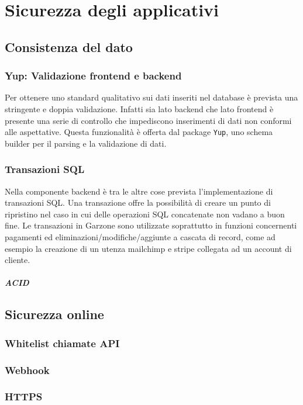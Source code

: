 \chapter{Sicurezza degli applicativi}
\section{Consistenza del dato}
\subsection{Yup: Validazione frontend e backend}
Per ottenere uno standard qualitativo sui dati inseriti nel database è prevista una stringente e doppia validazione. Infatti sia lato backend che lato frontend è presente una serie di controllo che impediscono inserimenti di dati non conformi alle aspettative. Questa funzionalità è offerta dal package \lstinline[basicstyle=\ttfamily]!Yup!, uno schema builder per il parsing e la validazione di dati.
\subsection{Transazioni SQL}
Nella componente backend è tra le altre cose prevista l'implementazione di transazioni SQL. Una transazione offre la possibilità di creare un punto di ripristino nel caso in cui delle operazioni SQL concatenate non vadano a buon fine. Le transazioni in Garzone sono utilizzate soprattutto in funzioni concernenti pagamenti ed eliminazioni/modifiche/aggiunte a cascata di record, come ad esempio la creazione di un utenza mailchimp e stripe collegata ad un account di cliente.
\paragraph{ACID}
\section{Sicurezza online}
\subsection{Whitelist chiamate API}
\subsection{Webhook}
\subsection{HTTPS}